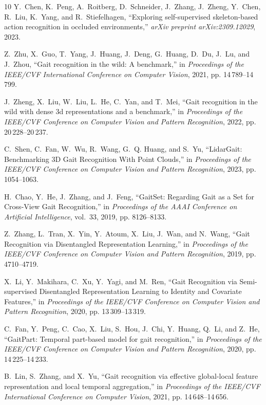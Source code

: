 \documentclass[journal]{IEEEtran}
\begin{document}
\begin{thebibliography}{10}
Y.~Chen, K.~Peng, A.~Roitberg, D.~Schneider, J.~Zhang, J.~Zheng, Y.~Chen,
  R.~Liu, K.~Yang, and R.~Stiefelhagen, ``Exploring self-supervised
  skeleton-based action recognition in occluded environments,'' \emph{{arXiv
  preprint arXiv:2309.12029}}, 2023.

Z.~Zhu, X.~Guo, T.~Yang, J.~Huang, J.~Deng, G.~Huang, D.~Du, J.~Lu, and
  J.~Zhou, ``Gait recognition in the wild: A benchmark,'' in \emph{{Proceedings
  of the IEEE/CVF International Conference on Computer Vision}}, 2021, pp.
  14\,789--14\,799.

J.~Zheng, X.~Liu, W.~Liu, L.~He, C.~Yan, and T.~Mei, ``Gait recognition in the
  wild with dense 3d representations and a benchmark,'' in \emph{{Proceedings
  of the IEEE/CVF Conference on Computer Vision and Pattern Recognition}},
  2022, pp. 20\,228--20\,237.

C.~Shen, C.~Fan, W.~Wu, R.~Wang, G.~Q. Huang, and S.~Yu, ``{LidarGait:
  Benchmarking 3D Gait Recognition With Point Clouds},'' in \emph{{Proceedings
  of the IEEE/CVF Conference on Computer Vision and Pattern Recognition}},
  2023, pp. 1054--1063.

H.~Chao, Y.~He, J.~Zhang, and J.~Feng, ``{GaitSet: Regarding Gait as a Set for
  Cross-View Gait Recognition},'' in \emph{{Proceedings of the AAAI Conference
  on Artificial Intelligence}}, vol.~33, 2019, pp. 8126--8133.

Z.~Zhang, L.~Tran, X.~Yin, Y.~Atoum, X.~Liu, J.~Wan, and N.~Wang, ``{Gait
  Recognition via Disentangled Representation Learning},'' in
  \emph{{Proceedings of the IEEE/CVF Conference on Computer Vision and Pattern
  Recognition}}, 2019, pp. 4710--4719.

X.~Li, Y.~Makihara, C.~Xu, Y.~Yagi, and M.~Ren, ``{Gait Recognition via
  Semi-supervised Disentangled Representation Learning to Identity and
  Covariate Features},'' in \emph{{Proceedings of the IEEE/CVF Conference on
  Computer Vision and Pattern Recognition}}, 2020, pp. 13\,309--13\,319.

C.~Fan, Y.~Peng, C.~Cao, X.~Liu, S.~Hou, J.~Chi, Y.~Huang, Q.~Li, and Z.~He,
  ``{GaitPart}: Temporal part-based model for gait recognition,'' in
  \emph{{Proceedings of the IEEE/CVF Conference on Computer Vision and Pattern
  Recognition}}, 2020, pp. 14\,225--14\,233.

B.~Lin, S.~Zhang, and X.~Yu, ``Gait recognition via effective global-local
  feature representation and local temporal aggregation,'' in
  \emph{{Proceedings of the IEEE/CVF International Conference on Computer
  Vision}}, 2021, pp. 14\,648--14\,656.


\end{thebibliography}
\end{document}
